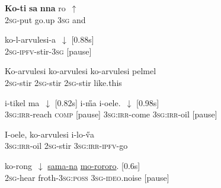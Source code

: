 \documentclass[output=paper]{LSP/langsci}
\begin{document}
  \begin{appendixexe}
 \ex \label{Guapp18}
\gll  \textbf{Ko-ti}       \textbf{sa}     \textbf{nna}  ro~$\uparrow$  \\     	       
\textsc{2sg}-put   go.up    \textsc{3sg}   and  \\
\glt {} 
\end{appendixexe}

  \begin{appendixexe}
 \ex \label{Guapp19}
\gll  ko-l-arvulesi-a~$\downarrow$  [0.88s]  \\     	       
\textsc{2sg-ipfv}-stir-\textsc{3sg} [pause]\\
\glt {} 
\end{appendixexe}

  \begin{appendixexe}
 \ex \label{Guapp20}
\gll  Ko-arvulesi    ko-arvulesi ko-arvulesi   pelmel   \\     	       
\textsc{2sg}-stir \textsc{2sg}-stir \textsc{2sg}-stir like.this \\
\glt {} 
\end{appendixexe}

  \begin{appendixexe}
 \ex \label{Guapp21}
\gll   i-tikel            ma~$\downarrow$     [0.82s]          i-\H{m}a           i-oele.~$\downarrow$ [0.98s]    \\     	       
 \textsc{3sg:irr}-reach     \textsc{comp}    [pause]   \textsc{3sg:irr}-come  \textsc{3sg:irr}-oil [pause]\\
\glt {} 
\end{appendixexe}

  \begin{appendixexe}
\ex \label{Guapp22}
\gll    I-oele, ko-arvulesi i-lo-\H{v}a \\     	       
  \textsc{3sg:irr}-oil \textsc{2sg}-stir  \textsc{3sg:irr-ipfv}-go\\
\glt {} 
\end{appendixexe}

  \begin{appendixexe}
\ex \label{Guapp23}
\gll   ko-rong~$\downarrow$    \underline{sama-na}               \underline{mo-rororo}.     [0.6s] \\ 
 \textsc{2sg}-hear  froth-\textsc{3sg:poss}     \textsc{3sg}-\textsc{ideo}.noise [pause]\\
\glt {} 
\end{appendixexe}
\end{document}
